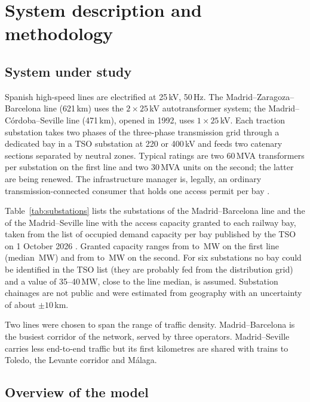 \section{System description and methodology}
\label{sec:methods}

\subsection{System under study}

Spanish high-speed lines are electrified at 25\,kV, 50\,Hz. The Madrid--Zaragoza--Barcelona line (621\,km) uses the $2\times25$\,kV autotransformer system; the Madrid--C\'ordoba--Seville line (471\,km), opened in 1992, uses $1\times25$\,kV. Each traction substation takes two phases of the three-phase transmission grid through a dedicated bay in a TSO substation at 220 or 400\,kV and feeds two catenary sections separated by neutral zones. Typical ratings are two 60\,MVA transformers per substation on the first line and two 30\,MVA units on the second; the latter are being renewed. The infrastructure manager is, legally, an ordinary transmission-connected consumer that holds one access permit per bay \cite{convenio2021}.

Table~\ref{tab:substations} lists the \mzbSubs{} substations of the Madrid--Barcelona line and the \msSubs{} of the Madrid--Seville line with the access capacity granted to each railway bay, taken from the list of occupied demand capacity per bay published by the TSO on 1 October 2026 \cite{ree2026posicion}. Granted capacity ranges from \mzbAccessMin{} to \mzbAccessMax\,MW on the first line (median \mzbAccessMed\,MW) and from \msAccessMin{} to \msAccessMax\,MW on the second. For six substations no bay could be identified in the TSO list (they are probably fed from the distribution grid) and a value of 35--40\,MW, close to the line median, is assumed. Substation chainages are not public and were estimated from geography with an uncertainty of about $\pm10$\,km.

Two lines were chosen to span the range of traffic density. Madrid--Barcelona is the busiest corridor of the network, served by three operators. Madrid--Seville carries less end-to-end traffic but its first kilometres are shared with trains to Toledo, the Levante corridor and M\'alaga.

\subsection{Overview of the model}

